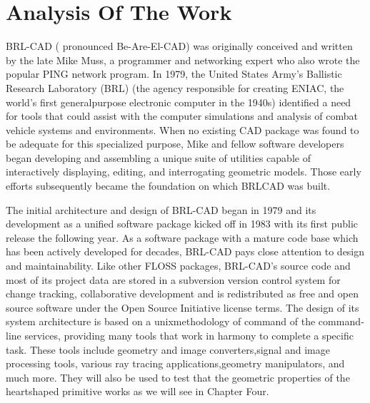 
\section{Analysis Of The Work}

\hspace{30} BRL­-CAD   (   pronounced   Be­-Are-­El-­CAD)   was   originally   conceived   and  
written   by   the   late   Mike   Muss,   a   programmer   and   networking   expert   who   also  
wrote   the   popular   PING   network   program.   In   1979,   the   United   States   Army's  
Ballistic   Research   Laboratory   (BRL)   (the   agency   responsible   for   creating  
ENIAC,   the   world's   first   general­purpose   electronic   computer   in   the   1940s)  
identified   a   need   for   tools   that   could   assist   with   the   computer   simulations   and  
analysis   of   combat   vehicle   systems   and   environments.   When   no   existing   CAD  
package   was   found   to   be   adequate   for   this   specialized   purpose,   Mike   and  
fellow   software   developers   began   developing   and   assembling   a   unique   suite   of  
utilities   capable   of   interactively   displaying,   editing,   and   interrogating   geometric  
models.   Those   early   efforts   subsequently   became   the   foundation   on   which  
BRL­CAD was built.  

\hspace{30} The   initial   architecture   and   design   of   BRL-­CAD   began   in   1979   and   its  
development   as   a   unified   software   package   kicked   off   in   1983   with   its   first  
public   release   the   following   year.   As   a   software   package   with   a   mature   code  
base   which   has   been   actively   developed   for   decades,   BRL-­CAD   pays   close  
attention   to   design   and   maintainability.   Like   other   FLOSS   packages,  
BRL­-CAD's   source   code   and   most   of   its   project   data   are   stored   in   a  
subversion   version   control   system   for   change   tracking,   collaborative  
development   and   is   redistributed   as   free   and   open   source   software   under   the  
Open   Source   Initiative   license   terms.   The   design   of   its   system   architecture   is  
based   on   a   unix­methodology   of   command   of   the   command­line   services,  
providing   many   tools   that   work   in   harmony   to   complete   a   specific   task.   These  
tools   include   geometry   and   image   converters,signal   and   image   processing  
tools,   various   ray   tracing   applications,geometry   manipulators,   and   much   more.  
They   will   also   be   used   to   test   that   the   geometric   properties   of   the   heart­shaped  
primitive works as we will see in Chapter Four.

